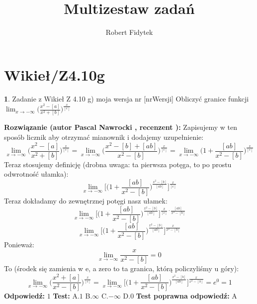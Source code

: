 \documentclass[12pt, a4paper]{article}
\title{Multizestaw zadań}
\author{Robert Fidytek}
\date{}
\theoremstyle{definition} %
\newtheorem{zad}{}
\newcommand{\kategoria}[1]{\section{#1}} %
\newcommand{\zadStart}[1]{\begin{zad}#1\newline} %
\newcommand{\zadStop}{\end{zad}}   %
\newcommand{\rozwStart}[2]{\noindent \textbf{Rozwiązanie (autor #1 , recenzent #2): }\newline} %
\newcommand{\odpStart}{\noindent \textbf{Odpowiedź:}\newline}    %
\newcommand{\odpStop}{\newline}                                             %
\newcommand{\testStart}{\noindent \textbf{Test:}\newline} %
\newcommand{\testStop}{\newline} %
\newcommand{\kluczStart}{\noindent \textbf{Test poprawna odpowiedź:}\newline} %
\newcommand{\kluczStop}{\newline} %
\begin{document}
\maketitle


\kategoria{Wikieł/Z4.10g}
\zadStart{Zadanie z Wikieł Z 4.10 g) moja wersja nr [nrWersji]}
Obliczyć granice funkcji $\displaystyle{\lim_{x \to -\infty}}\bigg(\frac{x^2-[a]}{x^2+[b]}\bigg)^{\frac{x}{[c]}}$
\zadStop
\rozwStart{Pascal Nawrocki}{}
Zapisujemy w ten sposób licznik aby otrzymać mianownik i dodajemy uzupełnienie:
$$\displaystyle{\lim_{x \to -\infty}}\bigg(\frac{x^2-[a]}{x^2+[b]}\bigg)^{\frac{x}{[c]}}=\displaystyle{\lim_{x \to -\infty}}\bigg(\frac{x^2-[b]+[ab]}{x^2-[b]}\bigg)^{\frac{x}{[c]}}=\displaystyle{\lim_{x \to -\infty}}\bigg(1+\frac{[ab]}{x^2-[b]}\bigg)^{\frac{x}{[c]}}$$
Teraz stosujemy definicję (drobna uwaga: ta pierwsza potęga, to po prostu odwrotność ułamka):
$$\displaystyle{\lim_{x \to -\infty}}\bigg[\bigg(1+\frac{[ab]}{x^2-[b]}\bigg)^{\frac{x^2-[b]}{[ab]}}\bigg]^{\frac{x}{[c]}}$$
Teraz dokładamy do zewnętrznej potęgi nasz ułamek:
$$\displaystyle{\lim_{x \to -\infty}}\bigg[\bigg(1+\frac{[ab]}{x^2-[b]}\bigg)^{\frac{x^2-[b]}{[ab]}}\bigg]^{\frac{x}{[c]}\cdot\frac{[ab]}{x^2-[b]}}$$
$$\displaystyle{\lim_{x \to -\infty}}\bigg[\bigg(1+\frac{[ab]}{x^2-[b]}\bigg)^{\frac{x^2-[b]}{[ab]}}\bigg]^{\frac{x}{x^2-[b]}}$$
Ponieważ:
$$\displaystyle{\lim_{x \to -\infty}}\frac{x}{x^2-[b]}=0$$
To (środek się zamienia w e, a zero to ta granica, którą policzyliśmy u góry):
$$\displaystyle{\lim_{x \to -\infty}}\bigg(\frac{x^2+[a]}{x^2-[b]}\bigg)^{\frac{x}{[c]}}=\displaystyle{\lim_{x \to -\infty}}\bigg[\bigg(1+\frac{[ab]}{x^2-[b]}\bigg)^{\frac{x^2-[b]}{[ab]}}\bigg]^{\frac{x}{x^2-[b]}}=e^0=1$$
\odpStart
$1$
\odpStop
\testStart
A.$1$
B.$\infty$
C.$-\infty$
D.$0$
\testStop
\kluczStart
A
\kluczStop
\end{document}
